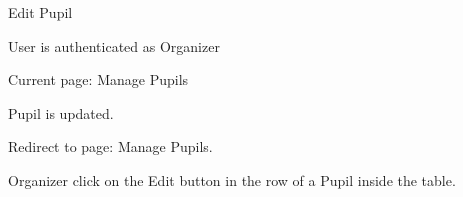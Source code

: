 \begin{uc}{Edit Pupil}
    \begin{uc-pre}
    \item User is authenticated as Organizer
    \item Current page: Manage Pupils
    \end{uc-pre}

    \begin{uc-post}
    \item Pupil is updated.
    \item Redirect to page: Manage Pupils.
    \end{uc-post}

    \begin{uc-trig}
        Organizer click on the Edit button in the row of a Pupil inside the
        table.
    \end{uc-trig}

\end{uc}
